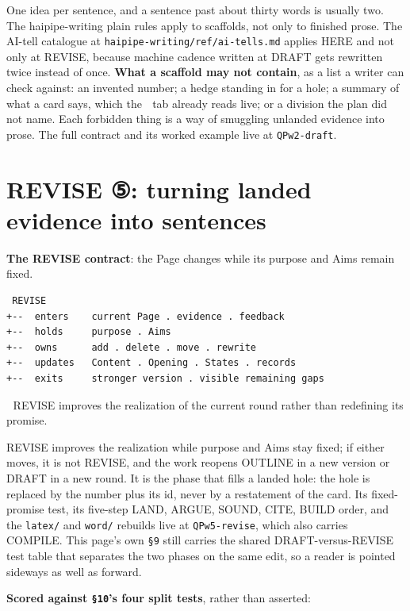 One idea per sentence, and a sentence past about thirty words is usually two. The haipipe-writing plain rules apply to scaffolds, not only to finished prose. The AI-tell catalogue at \texttt{haipipe-writing/ref/ai-tells.md} applies HERE and not only at REVISE, because machine cadence written at DRAFT gets rewritten twice instead of once. \textbf{What a scaffold may not contain}, as a list a writer can check against: an invented number; a hedge standing in for a hole; a summary of what a card says, which the 🧭 tab already reads live; or a division the plan did not name. Each forbidden thing is a way of smuggling unlanded evidence into prose. The full contract and its worked example live at \texttt{QPw2-draft}.


\section{REVISE ⑤: turning landed evidence into sentences}
\textbf{The REVISE contract}: the Page changes while its purpose and Aims remain fixed.

\begin{verbatim}
 REVISE
+--  enters    current Page . evidence . feedback
+--  holds     purpose . Aims
+--  owns      add . delete . move . rewrite
+--  updates   Content . Opening . States . records
+--  exits     stronger version . visible remaining gaps
\end{verbatim}
📌 REVISE improves the realization of the current round rather than redefining its promise.

REVISE improves the realization while purpose and Aims stay fixed; if either moves, it is not REVISE, and the work reopens OUTLINE in a new version or DRAFT in a new round. It is the phase that fills a landed hole: the hole is replaced by the number plus its id, never by a restatement of the card. Its fixed-promise test, its five-step LAND, ARGUE, SOUND, CITE, BUILD order, and the \texttt{latex/} and \texttt{word/} rebuilds live at \texttt{QPw5-revise}, which also carries COMPILE. This page's own \texttt{§9} still carries the shared DRAFT-versus-REVISE test table that separates the two phases on the same edit, so a reader is pointed sideways as well as forward.

\textbf{Scored against \texttt{§10}'s four split tests}, rather than asserted:

